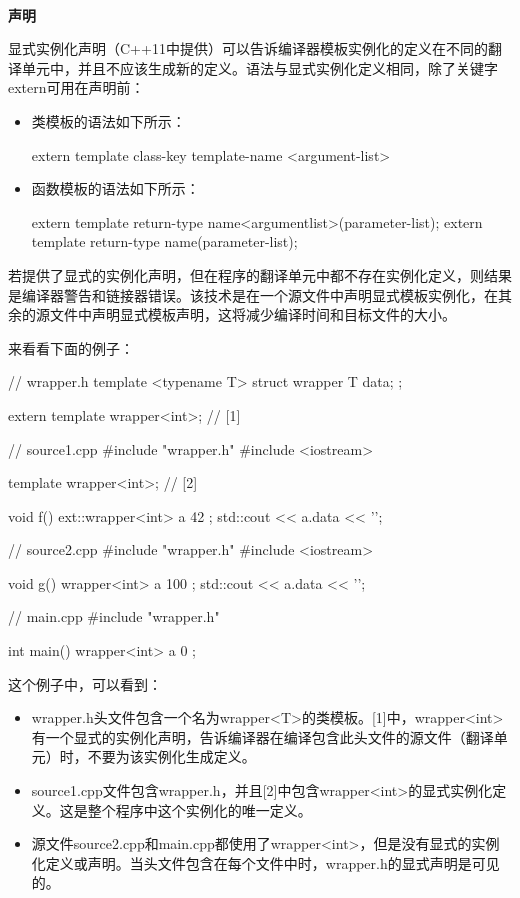 \hspace*{\fill} \\ %
\noindent\textbf{声明}

显式实例化声明（C++11中提供）可以告诉编译器模板实例化的定义在不同的翻译单元中，并且不应该生成新的定义。语法与显式实例化定义相同，除了关键字extern可用在声明前：

\begin{itemize}
  \item 类模板的语法如下所示：
\begin{cppcode}
extern template class-key template-name <argument-list>
\end{cppcode}
  \item 函数模板的语法如下所示：
\begin{cppcode}
extern template return-type name<argumentlist>(parameter-list);
extern template return-type name(parameter-list);
\end{cppcode}
\end{itemize}

若提供了显式的实例化声明，但在程序的翻译单元中都不存在实例化定义，则结果是编译器警告和链接器错误。该技术是在一个源文件中声明显式模板实例化，在其余的源文件中声明显式模板声明，这将减少编译时间和目标文件的大小。

来看看下面的例子：

\begin{cppcode}
// wrapper.h
template <typename T>
struct wrapper
{
	T data;
};

extern template wrapper<int>; // [1]

// source1.cpp
#include "wrapper.h"
#include <iostream>

template wrapper<int>; // [2]

void f()
{
	ext::wrapper<int> a{ 42 };
	std::cout << a.data << '\n';
}

// source2.cpp
#include "wrapper.h"
#include <iostream>

void g()
{
	wrapper<int> a{ 100 };
	std::cout << a.data << '\n';
}

// main.cpp
#include "wrapper.h"

int main()
{
	wrapper<int> a{ 0 };
}
\end{cppcode}

这个例子中，可以看到：

\begin{itemize}
  \item wrapper.h头文件包含一个名为wrapper<T>的类模板。[1]中，wrapper<int>有一个显式的实例化声明，告诉编译器在编译包含此头文件的源文件（翻译单元）时，不要为该实例化生成定义。
  \item source1.cpp文件包含wrapper.h，并且[2]中包含wrapper<int>的显式实例化定义。这是整个程序中这个实例化的唯一定义。
  \item 源文件source2.cpp和main.cpp都使用了wrapper<int>，但是没有显式的实例化定义或声明。当头文件包含在每个文件中时，wrapper.h的显式声明是可见的。
\end{itemize}

